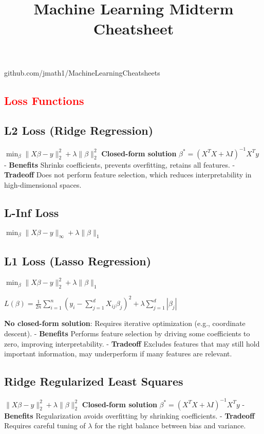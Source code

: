 \documentclass[10pt]{article}
\title{\vspace{-2cm} Machine Learning Midterm Cheatsheet}
\date{}
\begin{document}
\footnotesize

\begin{center}
  github.com/jmath1/MachineLearningCheatsheets
\end{center}
  
\begin{multicols}{2}

\section*{\textcolor{red}{Loss Functions}}
\subsection*{L2 Loss (Ridge Regression)}
$\min_{\beta} \|X\beta - y\|_2^2 + \lambda \|\beta\|_2^2$
\textbf{Closed-form solution} $\beta^* = (X^TX + \lambda I)^{-1}X^Ty$
- \textbf{Benefits} Shrinks coefficients, prevents overfitting, retains all features.
- \textbf{Tradeoff} Does not perform feature selection, which reduces interpretability in high-dimensional spaces.
\subsection*{L-Inf Loss}
$\min_{\beta} \|X\beta - y\|_{\infty} + \lambda \|\beta\|_1$
\subsection*{L1 Loss (Lasso Regression)}
$\min_{\beta} \|X\beta - y\|_2^2 + \lambda \|\beta\|_1$

$L(\beta) = \frac{1}{2n} \sum_{i=1}^{n} \left( y_i - \sum_{j=1}^{d} X_{ij} \beta_j \right)^2 + \lambda \sum_{j=1}^{d} |\beta_j|$

\textbf{No closed-form solution}: Requires iterative optimization (e.g., coordinate descent).
- \textbf{Benefits} Performs feature selection by driving some coefficients to zero, improving interpretability.
- \textbf{Tradeoff} Excludes features that may still hold important information, may underperform if many features are relevant.

\subsection*{Ridge Regularized Least Squares}
$\|X\beta - y\|_2^2 + \lambda\|\beta\|_2^2$
\textbf{Closed-form solution} $\beta^* = (X^TX + \lambda I)^{-1}X^Ty$
- \textbf{Benefits} Regularization avoids overfitting by shrinking coefficients.
- \textbf{Tradeoff} Requires careful tuning of \(\lambda\) for the right balance between bias and variance.


\end{multicols}
\end{document}
